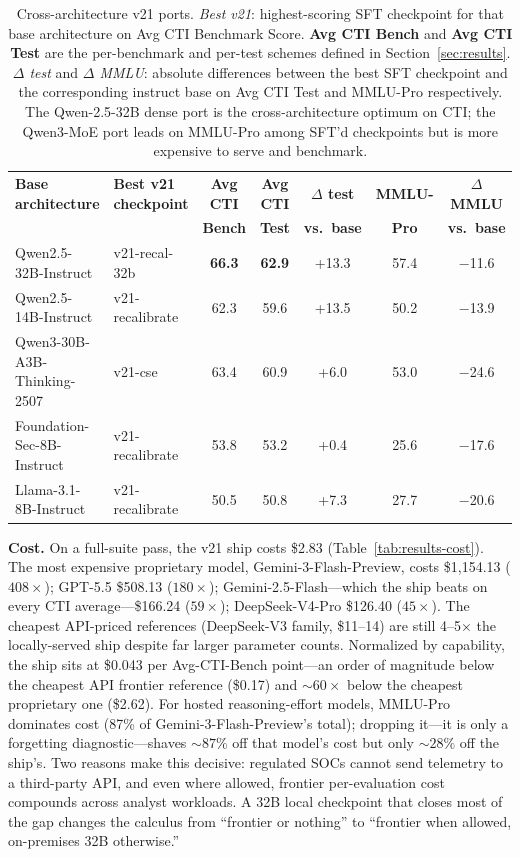 \documentclass[conference]{IEEEtran}
\begin{document}
\begin{table}[t]
\centering
\caption{Cross-architecture v21 ports. \emph{Best v21}: highest-scoring SFT checkpoint for that base architecture on Avg CTI Benchmark Score. \textbf{Avg CTI Bench} and \textbf{Avg CTI Test} are the per-benchmark and per-test schemes defined in Section~\ref{sec:results}. \emph{$\Delta$ test} and \emph{$\Delta$ MMLU}: absolute differences between the best SFT checkpoint and the corresponding instruct base on Avg CTI Test and MMLU-Pro respectively. The Qwen-2.5-32B dense port is the cross-architecture optimum on CTI; the Qwen3-MoE port leads on MMLU-Pro among SFT'd checkpoints but is more expensive to serve and benchmark.}
\label{tab:results-architectures}
\small
\setlength{\tabcolsep}{4pt}
\begin{tabular}{llccccc}
\hline
\textbf{Base architecture}  & \textbf{Best v21 checkpoint} & \textbf{Avg CTI} & \textbf{Avg CTI} & \textbf{$\Delta$ test} & \textbf{MMLU-} & \textbf{$\Delta$ MMLU} \\
                            &                              & \textbf{Bench}   & \textbf{Test}    & \textbf{vs.\ base}     & \textbf{Pro}   & \textbf{vs.\ base}     \\
\hline
Qwen2.5-32B-Instruct        & v21-recal-32b   & \textbf{66.3} & \textbf{62.9} & +13.3 & 57.4 & $-$11.6 \\
Qwen2.5-14B-Instruct        & v21-recalibrate & 62.3 & 59.6 & +13.5 & 50.2 & $-$13.9 \\
Qwen3-30B-A3B-Thinking-2507 & v21-cse         & 63.4 & 60.9 &  +6.0 & 53.0 & $-$24.6 \\
Foundation-Sec-8B-Instruct  & v21-recalibrate & 53.8 & 53.2 &  +0.4 & 25.6 & $-$17.6 \\
Llama-3.1-8B-Instruct       & v21-recalibrate & 50.5 & 50.8 &  +7.3 & 27.7 & $-$20.6 \\
\hline
\end{tabular}
\end{table}
\textbf{Cost.} On a full-suite pass, the v21 ship costs \$2.83 (Table~\ref{tab:results-cost}). The most expensive proprietary model, Gemini-3-Flash-Preview, costs \$1{,}154.13 ($408\times$); GPT-5.5 \$508.13 ($180\times$); Gemini-2.5-Flash---which the ship beats on every CTI average---\$166.24 ($59\times$); DeepSeek-V4-Pro \$126.40 ($45\times$). The cheapest API-priced references (DeepSeek-V3 family, \$11--14) are still 4--5$\times$ the locally-served ship despite far larger parameter counts. Normalized by capability, the ship sits at \$0.043 per Avg-CTI-Bench point---an order of magnitude below the cheapest API frontier reference (\$0.17) and ${\sim}60\times$ below the cheapest proprietary one (\$2.62). For hosted reasoning-effort models, MMLU-Pro dominates cost (87\% of Gemini-3-Flash-Preview's total); dropping it---it is only a forgetting diagnostic---shaves ${\sim}87\%$ off that model's cost but only ${\sim}28\%$ off the ship's. Two reasons make this decisive: regulated SOCs cannot send telemetry to a third-party API, and even where allowed, frontier per-evaluation cost compounds across analyst workloads. A 32B local checkpoint that closes most of the gap changes the calculus from ``frontier or nothing'' to ``frontier when allowed, on-premises 32B otherwise.''
\end{document}
